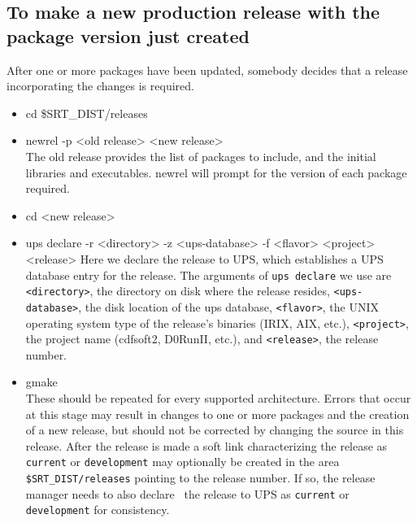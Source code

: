\documentclass[12pt]{article}
\begin{document}
\subsection{To make a new production release with the package version 
just created}
\label{sec_newrel}
After one or more packages  have been updated, somebody decides that a release
incorporating the changes is required.
\begin{itemize}
\item {\ttfamily cd \$SRT\_DIST/releases}
\item {\ttfamily newrel -p <old release> <new release>}\\
The old release provides the list of packages to include, and the initial 
libraries and executables. {\ttfamily newrel} will prompt for the version of
each package  required. 
\item {\ttfamily cd <new release>}
\item {\ttfamily ups declare -r <directory> -z <ups-database> -f <flavor> <project> <release>}
Here we declare the release to UPS, which establishes a UPS database entry for
the release. 
The arguments of \texttt{ups declare} we use are \texttt{<directory>}, the 
directory on disk where the release resides, \texttt{<ups-database>}, the
disk location of the ups database, \texttt{<flavor>}, the UNIX operating system 
type of the release's binaries (IRIX, AIX, etc.), \texttt{<project>}, the 
project name (cdfsoft2, D0RunII, etc.), and \texttt{<release>}, the release 
number.
\item {\ttfamily gmake}\\
These should be repeated for every supported architecture.  Errors that occur
at this stage may result in changes to one or more packages and the creation
of a new release, but should not be corrected by changing the source in this
release. After the release is made a soft link characterizing the release as
\texttt{current} or \texttt{development} may optionally be created in the
area \texttt{\$SRT\_DIST/releases} pointing to the release number.  If so, the
release manager needs to also declare~ the release to UPS 
as \texttt{current} or \texttt{development} for consistency.
\end{itemize}
\end{document}
